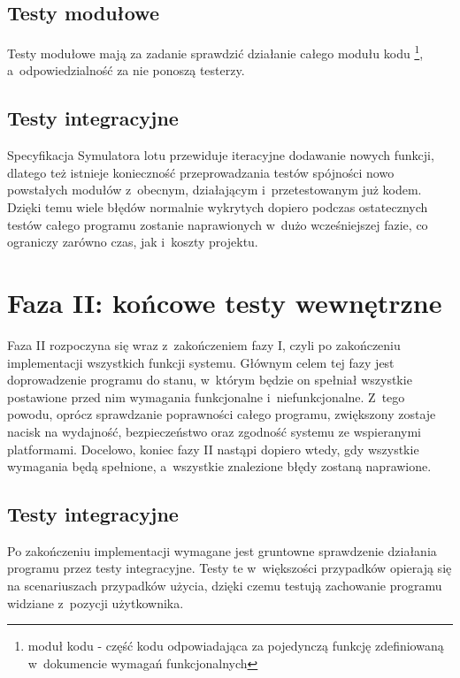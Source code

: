 \documentclass{mwrep}
\begin{document}
\section{Testy modułowe}
Testy modułowe mają za zadanie sprawdzić działanie całego modułu kodu \footnote{moduł kodu - część kodu odpowiadająca za pojedynczą funkcję zdefiniowaną w~dokumencie wymagań funkcjonalnych}, a~odpowiedzialność za nie ponoszą testerzy.

\section{Testy integracyjne}
Specyfikacja Symulatora lotu przewiduje iteracyjne dodawanie nowych funkcji, dlatego też istnieje konieczność przeprowadzania testów spójności nowo powstałych modułów z~obecnym, działającym i~przetestowanym już kodem. Dzięki temu wiele błędów normalnie wykrytych dopiero podczas ostatecznych testów całego programu zostanie naprawionych w~dużo wcześniejszej fazie, co ograniczy zarówno czas, jak i~koszty projektu.

\chapter{Faza II: końcowe testy wewnętrzne}
Faza II rozpoczyna się wraz z~zakończeniem fazy I, czyli po zakończeniu implementacji wszystkich funkcji systemu. Głównym celem tej fazy jest doprowadzenie programu do stanu, w~którym będzie on spełniał wszystkie postawione przed nim wymagania funkcjonalne i~niefunkcjonalne. Z~tego powodu, oprócz sprawdzanie poprawności całego programu, zwiększony zostaje nacisk na wydajność, bezpieczeństwo oraz zgodność systemu ze wspieranymi platformami. Docelowo, koniec fazy II nastąpi dopiero wtedy, gdy wszystkie wymagania będą spełnione, \linebreak a~wszystkie znalezione błędy zostaną naprawione.

\section{Testy integracyjne}
Po zakończeniu implementacji wymagane jest gruntowne sprawdzenie działania programu przez testy integracyjne. Testy te w~większości przypadków opierają się na scenariuszach przypadków użycia, dzięki czemu testują zachowanie programu widziane z~pozycji użytkownika.
\end{document}
